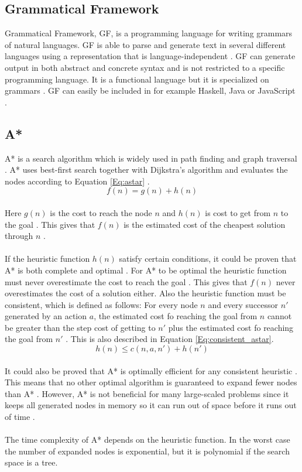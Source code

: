 \subsection{Grammatical Framework}
Grammatical Framework, GF, is a programming language for writing grammars of
natural languages. GF is able to parse and generate text in several different
languages using a representation that is language-independent \citep{gf_url}.
GF can generate output in both abstract and concrete syntax and is not
restricted to a specific programming language. It is a functional language but
it is specialized on grammars \citep{gf_url}. 
GF can easily be included in for example Haskell, Java or JavaScript \citep{gf_url}.

\subsection{A*}
A* is a search algorithm which is widely used in path finding and graph
traversal \citep{astar_url}. A* uses best-first search together with Dijkstra's
algorithm and evaluates the nodes according to Equation \ref{Eq:astar}
\citep{astar_url}. \\
\begin{equation}
f(n) = g(n) + h(n)
\label{Eq:astar}
\end{equation}\\
Here $g(n)$ is the cost to reach the node $n$ and $h(n)$ is cost to get from $n$
to the goal \citep{astar_url}. This gives that $f(n)$ is the estimated
cost of the cheapest solution through $n$ \citep{astar_url}. 
\\\\
If the heuristic function $h(n)$ satisfy certain conditions, it could be proven
that A* is both complete and optimal \citep{astar_ai}. For A* to be optimal the
heuristic function must never overestimate the cost to reach the goal
\citep{astar_ai}. This gives that $f(n)$ never overestimates the cost of a
solution either. Also the heuristic function must be consistent, which is
defined as follows: For every node $n$ and every successor $n'$ generated by an
action $a$, the estimated cost fo reaching the goal from $n$ cannot be greater
than the step cost of getting to $n'$ plus the estimated cost fo reaching the
goal from $n'$ \citep{astar_ai}. This is also described in Equation
\ref{Eq:consistent_astar}.\\
\begin{equation}
h(n) \leq c(n, a, n') + h(n')
\label{Eq:consistent_astar}
\end{equation}\\
It could also be proved that A* is optimally efficient for any consistent
heuristic \citep{astar_ai}. This means that no other optimal algorithm is
guaranteed to expand fewer nodes than A* \citep{astar_ai}. However, A* is not
beneficial for many large-scaled problems since it keeps all generated nodes in
memory so it can run out of space before it runs out of time
\citep{astar_ai}.\\\\ The time complexity of A* depends on the heuristic
function. In the worst case the number of expanded nodes is exponential, but it
is polynomial if the search space is a tree.
